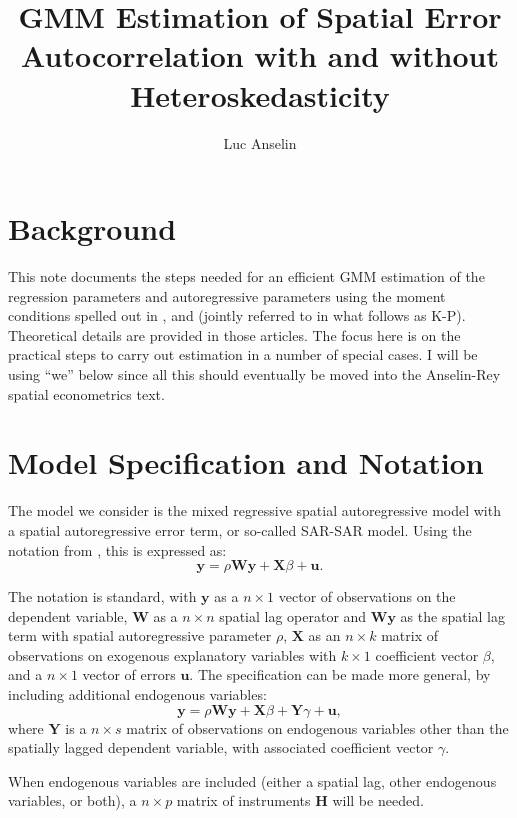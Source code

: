 \documentclass{article}
\title{GMM Estimation of Spatial Error Autocorrelation with and
without Heteroskedasticity}
\author{Luc Anselin}
\begin{document}
\maketitle
\section{Background}
This note documents the steps needed for an efficient GMM estimation of the
regression parameters and autoregressive parameters using the moment conditions
spelled out in \cite{KelejianPrucha:09}, \cite{Arraizetal:10} and \cite{Drukkeretal:10} (jointly referred to in what
follows as K-P). Theoretical details are
provided in those articles. The focus here is on the practical steps to carry out estimation
in a number of special cases. I will be using ``we'' below since all this should eventually
be moved into the Anselin-Rey spatial econometrics text.

\section{Model Specification and Notation}

The model we consider is the mixed regressive spatial autoregressive model with
a spatial autoregressive error term, or so-called SAR-SAR model. Using the notation from \cite{Anselin:88}, this
is expressed as:
\begin{equation*}
    \mathbf{y} = \rho \mathbf{Wy} + \mathbf{X} \beta + \mathbf{u}.
    \label{model1}
\end{equation*}

The notation is standard, with $\mathbf{y}$ as a $n \times 1$ vector of observations
on the dependent variable, $\mathbf{W}$ as a $n \times n$ spatial lag operator and
$\mathbf{Wy}$ as the spatial lag term with spatial autoregressive parameter
$\rho$, $\mathbf{X}$ as an $n \times k$ matrix of observations
on exogenous explanatory variables with $k \times 1$ coefficient vector $\beta$, and a
$n \times 1$ vector of errors $\mathbf{u}$. The specification can be made more general, by
including additional endogenous variables:
\begin{equation*}
    \mathbf{y} = \rho \mathbf{Wy} + \mathbf{X} \beta + \mathbf{Y} \gamma + \mathbf{u},
\end{equation*}
where 
$\mathbf{Y}$ is a $n \times s$ matrix of observations on endogenous variables
other than the spatially lagged dependent variable, with associated coefficient
vector $\gamma$.

When endogenous variables are included
(either a spatial lag, other endogenous variables, or both), a $n \times p$ matrix of instruments $\mathbf{H}$ will be needed.
\end{document}
